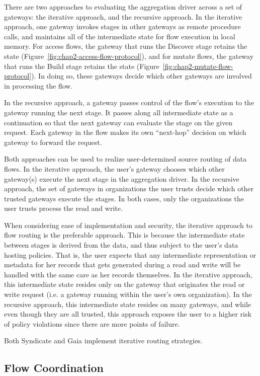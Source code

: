 There are two approaches to evaluating the aggregation driver across a set of
gateways:  the iterative approach, and the recursive approach.
In the iterative approach, one gateway invokes stages in other gateways as
remote procedure calls, and maintains all of the intermediate state for flow
execution in local memory.  For access flows, the gateway that runs the Discover
stage retains the state (Figure~\ref{fig:chap2-access-flow-protocol}), and for
mutate flows, the gateway that runs the Build stage retains the state
(Figure~\ref{fig:chap2-mutate-flow-protocol}).  In doing so, these gateways
decide which other gateways are involved in processing the flow.

In the recursive approach, a gateway passes control of the flow's execution
to the gateway running the next stage.  It passes along all intermediate
state as a continuation so that the next gateway can evaluate the stage on the
given request.  Each gateway in the flow makes its own
``next-hop'' decision on which gateway to forward the request.

Both approaches can be used to realize user-determined source routing of data
flows.  In the iterative approach, the user's gateway chooses which other gateway(s) execute
the next stage in the aggregation driver.  In the recursive approach, the set of
gateways in organizations the user trusts decide which other trusted gateways
execute the stages.  In both cases, only the organizations the user trusts
process the read and write.

When considering ease of implementation and security, the iterative approach to flow
routing is the preferable approach.  This is because the intermediate state between
stages is derived from the data, and thus
subject to the user's data hosting policies.  That is, the user expects
that any intermediate representation or metadata for her records that gets
generated during a read and write will be handled with the same care as her
records themselves.  In the iterative approach, this intermediate state resides
only on the gateway that originates the read or write request (i.e. a gateway
running within the user's own organization).  In the recursive approach, this
intermediate state resides on many gateways, and while even though they are all
trusted, this approach exposes the user to a higher risk of policy violations
since there are more points of failure.

Both Syndicate and Gaia implement iterative routing strategies.

\subsection{Flow Coordination}
\label{sec:flow-coordination}

